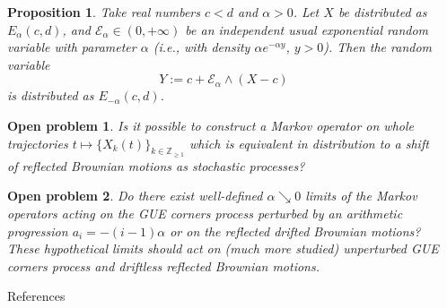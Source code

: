 \documentclass[english,final,t]{beamer}
\newtheorem{proposition}{Proposition}[section]
\newtheorem{question}{Open problem}
\begin{document}
\begin{frame}{}
\begin{columns}[t]
\begin{column}{.26\linewidth}
        \end{column}

        \begin{column}{.26\linewidth}
            \begin{proposition}
                \label{prop:elementary_swap}
                Take real numbers $c<d$ and $\alpha>0$. 
                Let $X$ be distributed as $E_\alpha(c,d)$,
                and $\mathscr{E}_\alpha\in(0,+\infty)$ be an independent usual
                exponential random variable with parameter $\alpha$
                (i.e., with density $\alpha e^{-\alpha y}$, $y>0$). Then
                the random variable
                \begin{equation}
                    \label{eq:Y_as_function_of_X_elementary_swap}
                    Y:=c+\mathcal{E}_\alpha\wedge(X-c)
                \end{equation}
                is distributed as $E_{-\alpha}(c,d)$.
            \end{proposition}
            \begin{question}
                Is it possible to construct a Markov operator 
                on whole trajectories $t\mapsto \{X_k(t) \}_{k\in \mathbb{Z}_{\ge1}}$
                which is equivalent in distribution to a shift of 
                reflected Brownian motions as stochastic processes?
            \end{question}
            \begin{question}
                Do there exist well-defined $\alpha\searrow0$ limits of the Markov operators acting 
                on the GUE corners process perturbed by an arithmetic progression $a_i=-(i-1)\alpha$
                or on the reflected drifted Brownian motions? 
                These hypothetical limits should act on (much more studied)
                unperturbed GUE corners process and driftless reflected Brownian motions.
            \end{question}
            \begin{block}{References}
                
                
            \end{block}
        \end{column}
    \end{columns}
\end{frame}
\nocite{warren2005dyson}
\end{document}
